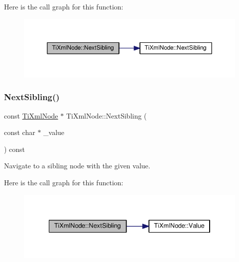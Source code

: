 Here is the call graph for this function\+:
\nopagebreak
\begin{figure}[H]
\begin{center}
\leavevmode
\includegraphics[width=350pt]{class_ti_xml_node_a4d05f7b1d7b470ac6887edd072d4892a_cgraph}
\end{center}
\end{figure}
\mbox{\label{class_ti_xml_node_a0864ea784b53cdca0a37829d3391ca4b}} 
\subsubsection{\texorpdfstring{Next\+Sibling()}{NextSibling()}\hspace{0.1cm}{\footnotesize\ttfamily [3/4]}}
{\footnotesize\ttfamily const \hyperlink{class_ti_xml_node}{Ti\+Xml\+Node} $\ast$ Ti\+Xml\+Node\+::\+Next\+Sibling (\begin{DoxyParamCaption}\item[{const char $\ast$}]{\+\_\+value }\end{DoxyParamCaption}) const}



Navigate to a sibling node with the given \textquotesingle{}value\textquotesingle{}. 

Here is the call graph for this function\+:
\nopagebreak
\begin{figure}[H]
\begin{center}
\leavevmode
\includegraphics[width=334pt]{class_ti_xml_node_a0864ea784b53cdca0a37829d3391ca4b_cgraph}
\end{center}
\end{figure}
\mbox{\label{class_ti_xml_node_a4080bc5cc8a5c139e7cf308669e850fc}} 
